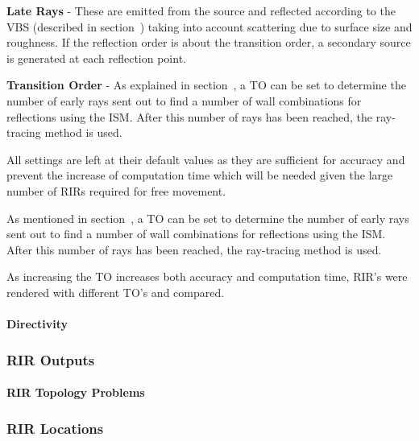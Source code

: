 \documentclass[../../main.tex]{subfiles}
\begin{document}
				\textbf{Late Rays} - These are emitted from the source and reflected according to the \ac{VBS} (described in section~) taking into account scattering due to surface size and roughness. If the reflection order is about the transition order, a secondary source is generated at each reflection point.

				\textbf{Transition Order} - As explained in section~, a \ac{TO} can be set to determine the number of early rays sent out to find a number of wall combinations for reflections using the \ac{ISM}. After this number of rays has been reached, the ray-tracing method is used.


				All settings are left at their default values as they are sufficient for accuracy and prevent the increase of computation time which will be needed given the large number of RIRs required for free movement.


				As mentioned in section~, a \ac{TO} can be set to determine the number of early rays sent out to find a number of wall combinations for reflections using the \ac{ISM}. After this number of rays has been reached, the ray-tracing method is used.

				As increasing the \ac{TO} increases both accuracy and computation time, \ac{RIR}'s were rendered with different \ac{TO}'s and compared.



			\paragraph{Directivity}



	\subsubsection{RIR Outputs}

		\paragraph{RIR Topology Problems}
		\label{odeonError}




	\subsubsection{RIR Locations}
	
\end{document}
